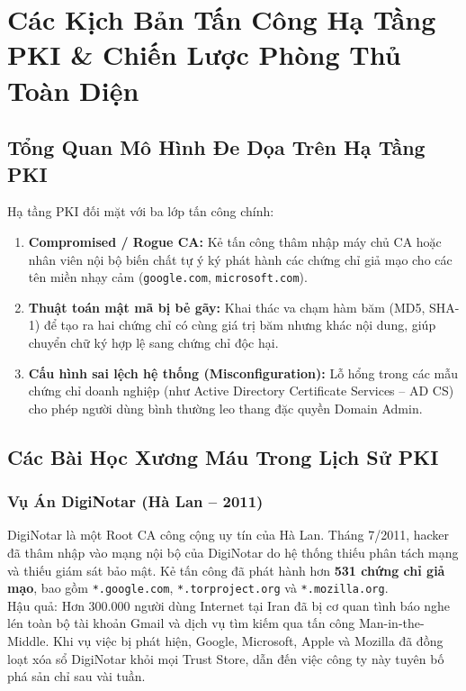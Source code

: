 \chapter{Các Kịch Bản Tấn Công Hạ Tầng PKI \& Chiến Lược Phòng Thủ Toàn Diện}


\section{Tổng Quan Mô Hình Đe Dọa Trên Hạ Tầng PKI}

Hạ tầng PKI đối mặt với ba lớp tấn công chính:
\begin{enumerate}
  \item \textbf{Compromised / Rogue CA:} Kẻ tấn công thâm nhập máy chủ CA hoặc nhân viên nội bộ biến chất tự ý ký phát hành các chứng chỉ giả mạo cho các tên miền nhạy cảm (\texttt{google.com}, \texttt{microsoft.com}).
  \item \textbf{Thuật toán mật mã bị bẻ gãy:} Khai thác va chạm hàm băm (MD5, SHA-1) để tạo ra hai chứng chỉ có cùng giá trị băm nhưng khác nội dung, giúp chuyển chữ ký hợp lệ sang chứng chỉ độc hại.
  \item \textbf{Cấu hình sai lệch hệ thống (Misconfiguration):} Lỗ hổng trong các mẫu chứng chỉ doanh nghiệp (như Active Directory Certificate Services -- AD CS) cho phép người dùng bình thường leo thang đặc quyền Domain Admin.
\end{enumerate}

\section{Các Bài Học Xương Máu Trong Lịch Sử PKI}

\subsection{Vụ Án DigiNotar (Hà Lan -- 2011)}

DigiNotar là một Root CA công cộng uy tín của Hà Lan. Tháng 7/2011, hacker đã thâm nhập vào mạng nội bộ của DigiNotar do hệ thống thiếu phân tách mạng và thiếu giám sát bảo mật. Kẻ tấn công đã phát hành hơn \textbf{531 chứng chỉ giả mạo}, bao gồm \texttt{*.google.com}, \texttt{*.torproject.org} và \texttt{*.mozilla.org}.\\
Hậu quả: Hơn 300.000 người dùng Internet tại Iran đã bị cơ quan tình báo nghe lén toàn bộ tài khoản Gmail và dịch vụ tìm kiếm qua tấn công Man-in-the-Middle. Khi vụ việc bị phát hiện, Google, Microsoft, Apple và Mozilla đã đồng loạt xóa sổ DigiNotar khỏi mọi Trust Store, dẫn đến việc công ty này tuyên bố phá sản chỉ sau vài tuần.

